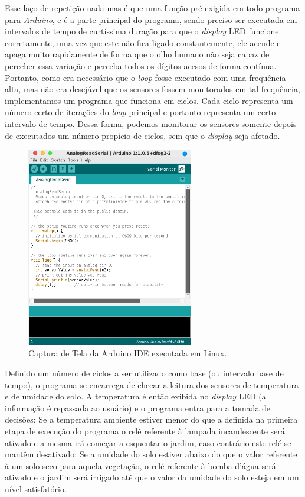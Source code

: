 \documentclass[a4paper,12pt]{article}
\begin{document}
    Esse laço de repetição nada mas é que uma função pré-exigida em todo programa para \textit{Arduino}, e é a parte principal do programa, sendo preciso ser executada em intervalos de tempo de curtíssima duração para que o \textit{display} LED funcione corretamente, uma vez que este não fica ligado constantemente, ele acende e apaga muito rapidamente de forma que o olho humano não seja capaz de perceber essa variação e perceba todos os dígitos acesos de forma contínua. Portanto, como era necessário que o \textit{loop} fosse executado com uma frequência alta, mas não era desejável que os sensores fossem monitorados em tal frequência, implementamos um programa que funciona em ciclos. Cada ciclo representa um número certo de iterações do \textit{loop} principal e portanto representa um certo intervalo de tempo. Dessa forma, podemos monitorar os sensores somente depois de executados um número propício de ciclos, sem que o \textit{display} seja afetado. \cite{arduinorobotics}

		\begin{figure}[!ht]
			\centering
				\includegraphics[width=0.65\textwidth]{arduinoIDE.jpg}
				\caption{Captura de Tela da Arduino IDE executada em Linux.}
		\end{figure}

    Definido um número de ciclos a ser utilizado como base (ou intervalo base de tempo), o programa se encarrega de checar a leitura dos sensores de temperatura e de umidade do solo. A temperatura é então exibida no \textit{display} LED (a informação é repassada ao usuário) e o programa entra para a tomada de decisões: Se a temperatura ambiente estiver menor do que a definida na primeira etapa de execução do programa o relé referente à lampada incandescente será ativado e a mesma irá começar a esquentar o jardim, caso contrário este relé se mantêm desativado; Se a umidade do solo estiver abaixo do que o valor referente à um solo seco para aquela vegetação, o relé referente à bomba d’água será ativado e o jardim será irrigado até que o valor da umidade do solo esteja em um nível satisfatório.
\end{document}
